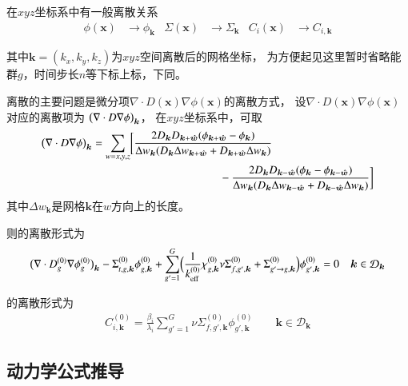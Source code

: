 在$xyz$坐标系中有一般离散关系
\begin{align}
  \phi(\bm{x}) &\rightarrow \phi_{\bm{k}} &
  \Sigma(\bm{x}) &\rightarrow \Sigma_{\bm{k}} &
  C_i(\bm{x}) &\rightarrow C_{i,\bm{k}}
\end{align}

其中$\bm{k}=(k_x,k_y,k_z)$为$xyz$空间离散后的网格坐标，
为方便起见这里暂时省略能群$g$，时间步长$n$等下标上标，下同。

离散的主要问题是微分项$\nabla\cdot D(\bm{x})\nabla\phi(\bm{x})$的离散方式，
设$\nabla\cdot D(\bm{x})\nabla\phi(\bm{x})$对应的离散项为
$\pb[b]{\nabla\cdot D\nabla\phi}_{\bm{k}}$，
在$xyz$坐标系中，可取
\begin{align}
  \begin{aligned}
  \pb[b]{\nabla\cdot D\nabla\phi}_{\bm{k}}
    &=\sum_{w=x,y,z} \Sb[bg]{
      \frac{2D_{\bm{k}}D_{\bm{k}+\hat{\bm{w}}}\pb{\phi_{\bm{k}+\hat{\bm{w}}} - \phi_{\bm{k}}}}
           {\Delta w_{\bm{k}}\pb{D_{\bm{k}}\Delta w_{\bm{k}+\hat{\bm{w}}}+D_{\bm{k}+\hat{\bm{w}}}\Delta w_{\bm{k}}}}
           \\
    &\hspace{4cm} -\frac{2D_{\bm{k}}D_{\bm{k}-\hat{\bm{w}}}\pb{\phi_{\bm{k}} - \phi_{\bm{k}-\hat{\bm{w}}}}}
           {\Delta w_{\bm{k}}\pb{D_{\bm{k}}\Delta w_{\bm{k}-\hat{\bm{w}}}+D_{\bm{k}-\hat{\bm{w}}}\Delta w_{\bm{k}}}}
     }
  \end{aligned}
  \label{equ:dnabla2.equ0}
\end{align}
其中$\Delta w_{\bm{k}}$是网格$\bm{k}$在$w$方向上的长度。

则的离散形式为
\begin{align}
  \pb[b]{\nabla\cdot D_g^{(0)} \nabla\phi_g^{(0)}}_{\bm{k}}
   -\Sigma_{t,g,\bm{k}}^{(0)} \phi_{g,\bm{k}}^{(0)}
   +\sum_{g'=1}^G\pb[B]{\frac{1}{k_\mathrm{eff}^{(0)}}\chi_{g,\bm{k}}^{(0)} \nu\Sigma_{f,g',\bm{k}}^{(0)}
                        +\Sigma_{g'\rightarrow g,\bm{k}}^{(0)}}\phi_{g',\bm{k}}^{(0)} =0
  \quad \bm{k} \in \mathcal{D}_{\bm{k}}
\end{align}

的离散形式为
\begin{align}
  C_{i,\bm{k}}^{(0)} = \frac{\beta_i}{\lambda_i}
    \sum_{g'=1}^G \nu\Sigma_{f,g',\bm{k}}^{(0)}\phi_{g',\bm{k}}^{(0)}
  \qquad \bm{k} \in \mathcal{D}_{\bm{k}}
\end{align}

\subsection{动力学公式推导}

